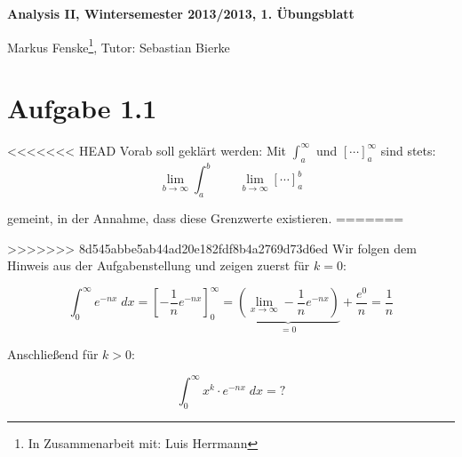 \documentclass[a4paper,german,12pt]{scrartcl}
\begin{document}
\begin{center}
\bfseries %
\sffamily %
\vspace{-40pt}
Analysis II, Wintersemester 2013/2013, 1. Übungsblatt

Markus Fenske\footnote[1]{In Zusammenarbeit mit: Luis Herrmann}, Tutor: Sebastian Bierke
\vspace{-10pt}
\end{center}

\section*{Aufgabe 1.1}

<<<<<<< HEAD
Vorab soll geklärt werden: Mit $\int_{a}^{\infty}$ und $\left[\cdots\right]_a^\infty$ sind stets:
\begin{equation*}
\lim\limits_{b \to \infty}\int_{a}^{b} \quad \quad \lim\limits_{b \to \infty}\left[\cdots\right]_a^b
\end{equation*}

gemeint, in der Annahme, dass diese Grenzwerte existieren.
=======
%


>>>>>>> 8d545abbe5ab44ad20e182fdf8b4a2769d73d6ed
Wir folgen dem Hinweis aus der Aufgabenstellung und zeigen zuerst für $k=0$:

\begin{equation*}
  \int_0^\infty e^{-nx} \; dx = \left[ -\frac{1}{n} e^{-nx} \right]_0^\infty = \underbrace{\left(\lim_{x \to \infty} - \frac{1}{n} e^{-nx} \right)}_{=0} + \frac{e^0}{n} = \frac{1}{n}
\end{equation*}

Anschließend für $k > 0$:

\begin{equation*}
  \int_0^\infty x^k \cdot e^{-nx} \; dx = \text{?}
\end{equation*}
\end{document}
